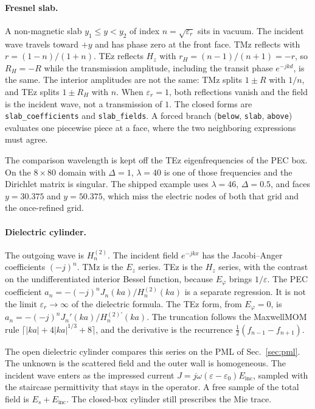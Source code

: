 \documentclass[11pt,a4paper]{article}
\begin{document}
\paragraph{Fresnel slab.}
A non-magnetic slab $y_1\le y<y_2$ of index $n=\sqrt{\varepsilon_r}$ sits in
vacuum. The incident wave travels toward $+y$ and has phase zero at the
front face. TMz reflects with $r=(1-n)/(1+n)$. TEz reflects $H_z$ with
$r_H=(n-1)/(n+1)=-r$, so $R_H=-R$ while the transmission amplitude,
including the transit phase $e^{-jkd}$, is the same. The interior
amplitudes are not the same: TMz splits $1\pm R$ with $1/n$, and TEz splits
$1\pm R_H$ with $n$. When $\varepsilon_r=1$, both reflections vanish and the
field is the incident wave, not a transmission of $1$. The closed forms are
\texttt{slab\_coefficients} and \texttt{slab\_fields}. A forced branch
(\texttt{below}, \texttt{slab}, \texttt{above}) evaluates one piecewise
piece at a face, where the two neighboring expressions must agree.

The comparison wavelength is kept off the TEz eigenfrequencies of the PEC
box. On the $8\times 80$ domain with $\Delta=1$, $\lambda=40$ is one of
those frequencies and the Dirichlet matrix is singular. The shipped example
uses $\lambda=46$, $\Delta=0.5$, and faces $y=30.375$ and $y=50.375$, which
miss the electric nodes of both that grid and the once-refined grid.

\paragraph{Dielectric cylinder.}
The outgoing wave is $H_n^{(2)}$. The incident field $e^{-jkx}$ has the
Jacobi--Anger coefficients $(-j)^n$. TMz is the $E_z$ series. TEz is the
$H_z$ series, with the contrast on the undifferentiated interior Bessel
function, because $E_\varphi$ brings $1/\varepsilon$. The PEC coefficient
$a_n=-(-j)^n J_n(ka)/H_n^{(2)}(ka)$ is a separate regression. It is not the
limit $\varepsilon_r\to\infty$ of the dielectric formula. The TEz form,
from $E_\varphi=0$, is
$a_n=-(-j)^n J_n'(ka)/H_n^{(2)\prime}(ka)$. The truncation
follows the MaxwellMOM rule
$\lceil |ka|+4|ka|^{1/3}+8\rceil$, and the derivative is the recurrence
$\tfrac12(f_{n-1}-f_{n+1})$.

The open dielectric cylinder compares this series on the PML of
Sec.~\ref{sec:pml}. The unknown is the scattered field and the outer wall
is homogeneous. The incident wave enters as the impressed current
$J=j\omega(\varepsilon-\varepsilon_0)E_{\mathrm{inc}}$, sampled with the
staircase permittivity that stays in the operator. A free sample of the
total field is $E_s+E_{\mathrm{inc}}$. The closed-box cylinder still
prescribes the Mie trace.
\end{document}
